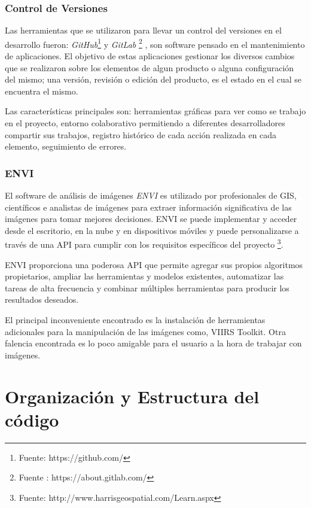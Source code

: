 \subsubsection*{Control de Versiones}

Las herramientas que se utilizaron para llevar un control del versiones en el desarrollo fueron: \textit{GitHub}\footnote{Fuente: https://github.com/} y \textit{GitLab} \footnote{Fuente : https://about.gitlab.com/} , son software pensado en el mantenimiento de aplicaciones. El objetivo de estas aplicaciones gestionar los diversos cambios que se realizaron sobre los elementos de algun producto o alguna configuración del mismo; una versión, revisión o edición del producto, es el estado en el cual se encuentra el mismo.

Las características principales son: herramientas gráficas para ver como se trabajo en el proyecto, entorno colaborativo permitiendo a diferentes desarrolladores compartir sus trabajos, registro histórico de cada acción realizada en cada elemento, seguimiento de errores.

\subsubsection*{ENVI}\label{sub:enviSoft}

El software de análisis de imágenes \textit{ENVI} es utilizado por profesionales de GIS, científicos e analistas de imágenes para extraer información significativa de las imágenes para tomar mejores decisiones. ENVI se puede implementar y acceder desde el escritorio, en la nube y en dispositivos móviles y puede personalizarse a través de una API para cumplir con los requisitos específicos del proyecto \footnote{Fuente: http://www.harrisgeospatial.com/Learn.aspx}.

ENVI proporciona una poderosa API que permite agregar sus propios algoritmos propietarios, ampliar las herramientas y modelos existentes, automatizar las tareas de alta frecuencia y combinar múltiples herramientas para producir los resultados deseados.

El principal inconveniente encontrado es la instalación de herramientas adicionales para la manipulación de las imágenes como, VIIRS Toolkit. Otra falencia encontrada es lo poco amigable para el usuario a la hora de trabajar con imágenes.

\section{Organización y Estructura del código}\label{sec:estructuracodigo}

